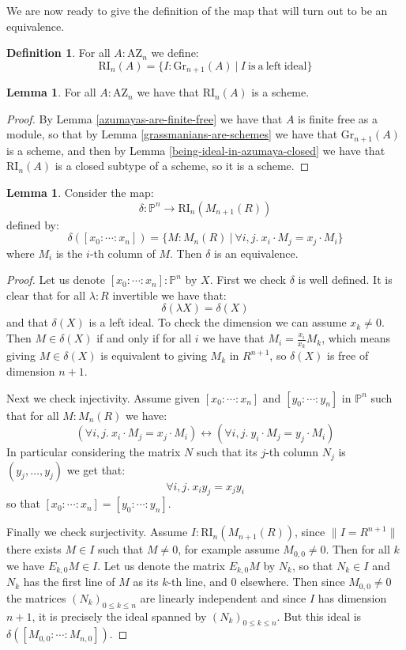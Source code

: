 \documentclass[10pt,a4paper]{article}
\theoremstyle{definition}
\newtheorem{lemma}[theorem]{Lemma}
\newtheorem{definition}[theorem]{Definition}
\newcommand{\Gr}{\mathrm{Gr}}
\newcommand{\RI}{\mathrm{RI}}
\newcommand{\AZ}{\mathrm{AZ}}
\newcommand{\propTrunc}[1]{\lVert #1 \rVert}
\newcommand{\bP}{\mathbb{P}}
\begin{document}
We are now ready to give the definition of the map that will turn out to be an equivalence.

\begin{definition}
For all $A:\AZ_n$ we define:
\[\RI_n(A) = \{I:\Gr_{n+1}(A)\ |\ I\ \mathrm{is\ a\ left\ ideal}\}\]
\end{definition}

\begin{lemma}\label{severi-brauer-are-schemes}
For all $A:\AZ_n$ we have that $\RI_n(A)$ is a scheme.
\end{lemma}

\begin{proof}
By Lemma \ref{azumayas-are-finite-free} we have that $A$ is finite free as a module, so that by Lemma \ref{grassmanians-are-schemes} we have that $\Gr_{n+1}(A)$ is a scheme, and then by Lemma \ref{being-ideal-in-azumaya-closed} we have that $\RI_n(A)$ is a closed subtype of a scheme, so it is a scheme.
\end{proof}

\begin{lemma}\label{right-ideal-of-matrices-are-projective}
Consider the map:
\[\delta:\bP^n \to \RI_n(M_{n+1}(R))\]
defined by:
\[\delta([x_0:\cdots:x_n]) = \{M:M_n(R)\ |\ \forall i,j.\ x_i\cdot M_j = x_j\cdot M_i\}\]
where $M_i$ is the $i$-th column of $M$. Then $\delta$ is an equivalence.
\end{lemma}

\begin{proof}
Let us denote $[x_0:\cdots:x_n]:\bP^n$ by $X$. First we check $\delta$ is well defined. It is clear that for all $\lambda:R$ invertible we have that:
\[\delta(\lambda X) = \delta(X)\]
and that $\delta(X)$ is a left ideal. To check the dimension we can assume $x_k\not=0$. Then $M\in\delta(X)$ if and only if for all $i$ we have that $M_i = \frac{x_i}{x_k} M_k$, which means giving $M\in\delta(X)$ is equivalent to giving $M_k$ in $R^{n+1}$, so $\delta(X)$ is free of dimension $n+1$.

Next we check injectivity. Assume given $[x_0:\cdots:x_n]$ and $[y_0:\cdots:y_n]$ in $\bP^n$ such that for all $M:M_n(R)$ we have:
\[(\forall i,j.\ x_i\cdot M_j = x_j\cdot M_i) \leftrightarrow (\forall i,j.\ y_i \cdot M_j = y_j\cdot M_i)\]
In particular considering the matrix $N$ such that its $j$-th column $N_j$ is $(y_j,\hdots,y_j)$ we get that:
\[\forall i,j.\ x_iy_j=x_jy_i\] 
so that $[x_0:\cdots:x_n] = [y_0:\cdots:y_n]$.

Finally we check surjectivity. Assume $I:\RI_n(M_{n+1}(R))$, since $\propTrunc{I=R^{n+1}}$ there exists $M\in I$ such that $M\not=0$, for example assume $M_{0,0}\not=0$. Then for all $k$ we have $E_{k,0}M\in I$. Let us denote the matrix $E_{k,0}M$ by $N_k$, so that $N_k\in I$ and $N_k$ has the first line of $M$ as its $k$-th line, and $0$ elsewhere. Then since $M_{0,0}\not=0$ the matrices $(N_k)_{0\leq k\leq n}$ are linearly independent and since $I$ has dimension $n+1$, it is precisely the ideal spanned by  $(N_k)_{0\leq k\leq n}$. But this ideal is $\delta([M_{0,0}:\cdots:M_{n,0}])$.
\end{proof}
\end{document}
